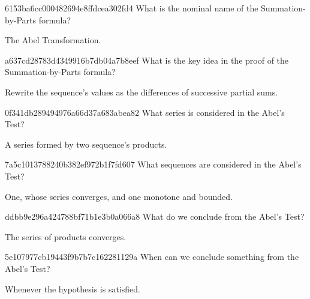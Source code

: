 \begin{note}{6153ba6cc000482694e8ffdcea302fd4}
    What is the nominal name of the Summation-by-Parts formula?

    \begin{cloze}{1}
        The Abel Transformation.
    \end{cloze}
\end{note}

\begin{note}{a637cd28783d4349916b7db04a7b8eef}
    What is the key idea in the proof of the Summation-by-Parts formula?

    \begin{cloze}{1}
        Rewrite the sequence's values as the differences of successive partial sums.
    \end{cloze}
\end{note}

\begin{note}{0f341db289494976a66d37a683abea82}
    What series is considered in the Abel's Test?

    \begin{cloze}{1}
        A series formed by two sequence's products.
    \end{cloze}
\end{note}

\begin{note}{7a5c1013788240b382ef972b1f7fd607}
    What sequences are considered in the Abel's Test?

    \begin{cloze}{1}
        One, whose series converges, and one monotone and bounded.
    \end{cloze}
\end{note}

\begin{note}{ddbb9e296a424788bf71b1e3b0a066a8}
    What do we conclude from the Abel's Test?

    \begin{cloze}{1}
        The series of products converges.
    \end{cloze}
\end{note}

\begin{note}{5e107977cb19443f9b7b7c162281129a}
    When can we conclude something from the Abel's Test?

    \begin{cloze}{1}
        Whenever the hypothesis is satisfied.
    \end{cloze}
\end{note}

